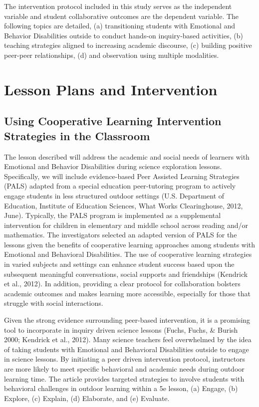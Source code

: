 \documentclass[11pt]{sig-alternate}
\begin{document}
\begin{large}
The intervention protocol included in this study serves as the independent variable and student collaborative outcomes are the dependent variable. The following topics are detailed, (a) transitioning students with Emotional and Behavior Disabilities outside to conduct hands-on inquiry-based activities, (b) teaching strategies aligned to increasing academic discourse, (c) building positive peer-peer relationships, (d) and observation using multiple modalities.

\section*{Lesson Plans and Intervention}
\subsection*{Using Cooperative Learning Intervention \\Strategies in the Classroom}

The lesson described will address the academic and social needs of learners with Emotional and Behavior Disabilities during science exploration lessons. Specifically, we will include evidence-based Peer Assisted Learning Strategies (PALS) adapted from a special education peer-tutoring program to actively engage students in less structured outdoor settings (U.S. Department of Education, Institute of Education Sciences, What Works Clearinghouse, 2012, June). Typically, the PALS program is implemented as a supplemental intervention for children in elementary and middle school across reading and/or mathematics. The investigators selected an adapted version of PALS for the lessons given the benefits of cooperative learning approaches among students with Emotional and Behavioral Disabilities. The use of cooperative learning strategies in varied subjects and settings can enhance student success based upon the subsequent meaningful conversations, social supports and friendships (Kendrick et al., 2012). In addition, providing a clear protocol for collaboration bolsters academic outcomes and makes learning more accessible, especially for those that struggle with social interactions. 

Given the strong evidence surrounding peer-based intervention, it is a promising tool to incorporate in inquiry driven science lessons (Fuchs, Fuchs, \& Burish 2000; Kendrick et al., 2012). Many science teachers feel overwhelmed by the idea of taking students with Emotional and Behavioral Disabilities outside to engage in science lessons. By initiating a peer driven intervention protocol, instructors are more likely to meet specific behavioral and academic needs during outdoor learning time. The article provides targeted strategies to involve students with behavioral challenges in outdoor learning within a 5e lesson, (a) Engage, (b) Explore, (c) Explain, (d) Elaborate, and (e) Evaluate. 


\end{large}
\end{document}
